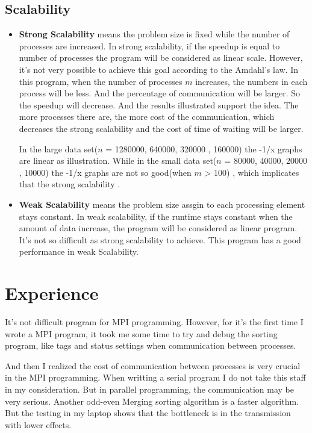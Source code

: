 \documentclass{article}
\begin{document}
	\subsection{Scalability}
	\begin{itemize}
		\item
			{\bf Strong Scalability} means the problem size
			is fixed while the number of processes are
			increased. In strong scalability, if the speedup
			is equal to number of processes the program will
			be considered as linear scale. However, it's not
			very possible to achieve this goal according to
			the Amdahl's law. In this program, when the number
			of processes $m$ increases, the numbers in each
			process will be less. And the percentage of
			communication will be larger. So the speedup will
			decrease. And the results illustrated support the
			idea. The more processes there are, the more cost
			of the communication, which decreases the strong
			scalability and the cost of time of waiting will
			be larger.

			In the large data set($n$ = 1280000, 640000, 320000
			, 160000) the -1/x graphs are linear as illustration.
			While in the small data set($n$ = 80000, 40000, 20000
			, 10000) the -1/x graphs are not so good(when $m$ > 100)
			, which	implicates that the strong scalability .

		\item
			{\bf Weak Scalability} means the problem size
			assgin to each processing element stays
			constant. In weak scalability, if the runtime
			stays constant when the amount of data increase,
			the program will be considered as linear program.
			It's not so difficult as strong scalability to
			achieve. This program has a good performance in
			weak Scalability.

	\end{itemize}



\section{Experience}
	It's not difficult program for MPI programming. However, for it's
	the first time I wrote a MPI program, it took me some time to try
	and debug the sorting program, like tags and status settings when
	communication between processes.

	And then I realized the cost of communication between processes is
	very crucial in the MPI programming. When writting a serial program
	I do not take this staff in my consideration. But in parallel
	programming, the communication may be very serious. Another odd-even
	Merging sorting algorithm is a faster algorithm. But the testing in
	my laptop shows that the bottleneck is in the transmission with lower
	effects.
\end{document}
